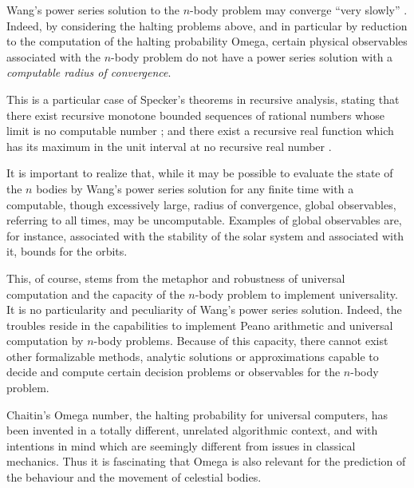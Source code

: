 \documentclass{ws-rv9x6}
\begin{document}
Wang's power series solution to the $n$-body problem \cite{Wang91,Wang01}
may converge ``very slowly'' \cite{Diacu96}.
Indeed, by considering the halting problems above, and
in particular by reduction to the computation of the halting probability Omega,
certain physical observables associated with the $n$-body problem
do not have a power series solution with a {\em computable radius of convergence}.

This is a particular case of Specker's theorems in recursive analysis, stating that
there exist recursive monotone bounded sequences of rational numbers
whose limit is no computable number
\cite{Specker49}; and
there exist a recursive real function which has its maximum in the unit interval
at no recursive real number \cite{Specker57}.

It is important to realize that,
while it may be possible to evaluate
the state of the $n$ bodies by Wang's power series solution
for any finite time with a computable,
though excessively large, radius of convergence,
global observables, referring to all times, may be uncomputable.
Examples of global observables are, for instance, associated
with the stability of the solar system and associated with it,
bounds for the orbits.

This, of course,
stems from the metaphor and robustness of universal computation
and the capacity of the $n$-body problem to implement universality.
It is no particularity and peculiarity of Wang's power series solution.
Indeed, the troubles reside in the capabilities to implement Peano arithmetic and
universal computation by $n$-body problems.
Because of this capacity, there cannot exist other formalizable methods,
analytic solutions or approximations capable to decide and compute certain decision problems
or observables for the $n$-body problem.

Chaitin's Omega number,
the halting probability for universal computers,
has been invented in a totally different, unrelated algorithmic context,
and with intentions in mind which are seemingly different from issues in classical mechanics.
Thus it is fascinating that Omega is also relevant for the prediction of the behaviour
and the movement of celestial bodies.



%
%
\end{document}
